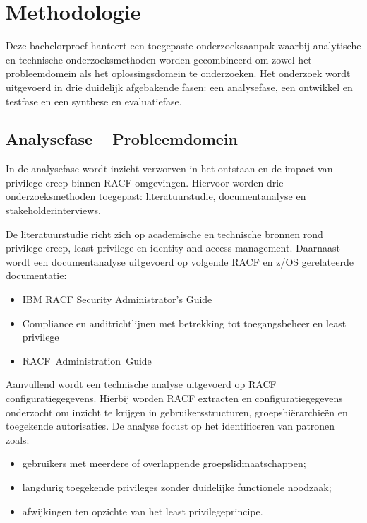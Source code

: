 

\section{Methodologie}%
\label{sec:methodologie}

Deze bachelorproef hanteert een toegepaste onderzoeksaanpak waarbij analytische en technische onderzoeksmethoden worden gecombineerd om zowel het probleemdomein als het oplossingsdomein te onderzoeken. Het onderzoek wordt uitgevoerd in drie duidelijk afgebakende fasen: een analysefase, een ontwikkel en testfase en een synthese en evaluatiefase.

\subsection{Analysefase – Probleemdomein}

In de analysefase wordt inzicht verworven in het ontstaan en de impact van privilege creep binnen RACF omgevingen. Hiervoor worden drie onderzoeksmethoden toegepast: literatuurstudie, documentanalyse en stakeholderinterviews.

De literatuurstudie richt zich op academische en technische bronnen rond privilege creep, least privilege en identity and access management. Daarnaast wordt een documentanalyse uitgevoerd op volgende RACF en z/OS gerelateerde documentatie:
\begin{itemize}
	\item IBM RACF Security Administrator’s Guide \autocite{ADMINGUIDE2026}
	\item Compliance en auditrichtlijnen met betrekking tot toegangsbeheer en least privilege \autocite{CybersecurityBelgie2026}
	\item \mbox{RACF Administration Guide \autocite{Corporation2026}}
\end{itemize}

Aanvullend wordt een technische analyse uitgevoerd op RACF configuratiegegevens. Hierbij worden RACF extracten en configuratiegegevens onderzocht om inzicht te krijgen in gebruikersstructuren, groepshiërarchieën en toegekende autorisaties. De analyse focust op het identificeren van patronen zoals:
\begin{itemize}
	\item gebruikers met meerdere of overlappende groepslidmaatschappen;
	\item langdurig toegekende privileges zonder duidelijke functionele noodzaak;
	\item afwijkingen ten opzichte van het least privilegeprincipe.
\end{itemize}

